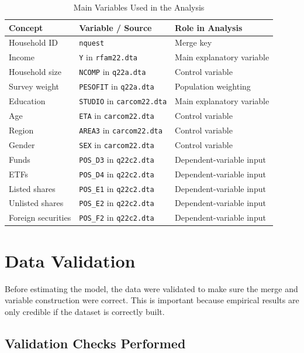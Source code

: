 \documentclass[12pt]{article}
\begin{document}
\begin{table}[H]
\centering
\caption{Main Variables Used in the Analysis}
\begin{tabular}{lll}
\toprule
\textbf{Concept} & \textbf{Variable / Source} & \textbf{Role in Analysis} \\
\midrule
Household ID & \texttt{nquest} & Merge key \\
Income & \texttt{Y} in \texttt{rfam22.dta} & Main explanatory variable \\
Household size & \texttt{NCOMP} in \texttt{q22a.dta} & Control variable \\
Survey weight & \texttt{PESOFIT} in \texttt{q22a.dta} & Population weighting \\
Education & \texttt{STUDIO} in \texttt{carcom22.dta} & Main explanatory variable \\
Age & \texttt{ETA} in \texttt{carcom22.dta} & Control variable \\
Region & \texttt{AREA3} in \texttt{carcom22.dta} & Control variable \\
Gender & \texttt{SEX} in \texttt{carcom22.dta} & Control variable \\
Funds & \texttt{POS\_D3} in \texttt{q22c2.dta} & Dependent-variable input \\
ETFs & \texttt{POS\_D4} in \texttt{q22c2.dta} & Dependent-variable input \\
Listed shares & \texttt{POS\_E1} in \texttt{q22c2.dta} & Dependent-variable input \\
Unlisted shares & \texttt{POS\_E2} in \texttt{q22c2.dta} & Dependent-variable input \\
Foreign securities & \texttt{POS\_F2} in \texttt{q22c2.dta} & Dependent-variable input \\
\bottomrule
\end{tabular}
\end{table}

\section{Data Validation}

Before estimating the model, the data were validated to make sure the merge and variable construction were correct. This is important because empirical results are only credible if the dataset is correctly built.

\subsection{Validation Checks Performed}
\end{document}
